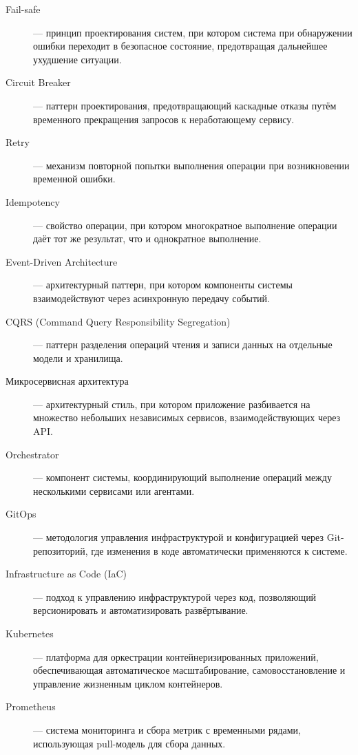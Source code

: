 \begin{sloppypar}
\begin{description}
    \item[Fail-safe] — принцип проектирования систем, при котором система при обнаружении ошибки переходит в безопасное состояние, предотвращая дальнейшее ухудшение ситуации.
    
    \item[Circuit Breaker] — паттерн проектирования, предотвращающий каскадные отказы путём временного прекращения запросов к неработающему сервису.
    
    \item[Retry] — механизм повторной попытки выполнения операции при возникновении временной ошибки.
    
    \item[Idempotency] — свойство операции, при котором многократное выполнение операции даёт тот же результат, что и однократное выполнение.
    
    \item[Event-Driven Architecture] — архитектурный паттерн, при котором компоненты системы взаимодействуют через асинхронную передачу событий.
    
    \item[CQRS (Command Query Responsibility Segregation)] — паттерн разделения операций чтения и записи данных на отдельные модели и хранилища.
    
    \item[Микросервисная архитектура] — архитектурный стиль, при котором приложение разбивается на множество небольших независимых сервисов, взаимодействующих через API.
    
    \item[Orchestrator] — компонент системы, координирующий выполнение операций между несколькими сервисами или агентами.
    
    \item[GitOps] — методология управления инфраструктурой и конфигурацией через Git-репозиторий, где изменения в коде автоматически применяются к системе.
    
    \item[Infrastructure as Code (IaC)] — подход к управлению инфраструктурой через код, позволяющий версионировать и автоматизировать развёртывание.
    
    \item[Kubernetes] — платформа для оркестрации контейнеризированных приложений, обеспечивающая автоматическое масштабирование, самовосстановление и управление жизненным циклом контейнеров.
    
    \item[Prometheus] — система мониторинга и сбора метрик с временными рядами, использующая pull-модель для сбора данных.
    

\end{description}
\end{sloppypar}
